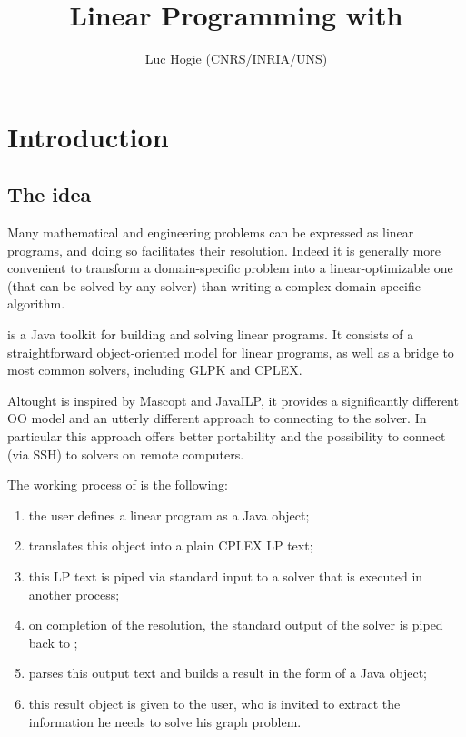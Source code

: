 \documentclass{article}
\title{Linear Programming with \jalinopt}
\author{Luc Hogie (CNRS/INRIA/UNS)}
\begin{document}
\maketitle



\section{Introduction}

\subsection{The idea}

Many mathematical and engineering problems can be expressed as linear programs, and doing so facilitates their resolution. Indeed it is generally more convenient to transform a domain-specific problem into a linear-optimizable one (that can be solved by any solver) than writing a complex domain-specific algorithm.

\jalinopt is a Java toolkit for building and solving linear programs.
It consists of a straightforward
object-oriented model for linear programs,
as well as a bridge to most common solvers, including GLPK and CPLEX.

Altought \jalinopt  is inspired by Mascopt and JavaILP, it provides a significantly different OO model and
an utterly different approach to connecting to the solver. In particular this approach offers better portability
and the possibility to connect (via SSH) to solvers on remote computers. 

The working process of \jalinopt is the following:
\begin{enumerate}
  \item the user defines a linear program as a Java object;
  \item \grph translates this object into a plain CPLEX LP text;
  \item this LP text is piped via standard input to a solver that is executed in another process;
  \item on completion of the resolution, the standard output of the solver is piped back to \grph;
  \item \grph parses this output text and builds a result in the form of a Java object;
  \item this result object is given to the user, who is invited to extract the information he needs to
  solve his graph problem. 
\end{enumerate}
\end{document}
